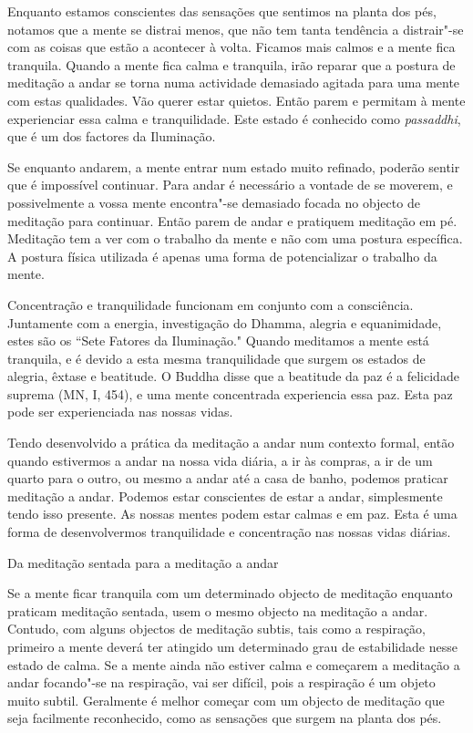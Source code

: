 Enquanto estamos conscientes das sensações que sentimos na planta dos
pés, notamos que a mente se distrai menos, que não tem tanta tendência a
distrair"-se com as coisas que estão a acontecer à volta. Ficamos mais
calmos e a mente fica tranquila. Quando a mente fica calma e tranquila,
irão reparar que a postura de meditação a andar se torna numa actividade
demasiado agitada para uma mente com estas qualidades. Vão querer estar
quietos. Então parem e permitam à mente experienciar essa calma e
tranquilidade. Este estado é conhecido como \emph{passaddhi}, que é um
dos factores da Iluminação.

Se enquanto andarem, a mente entrar num estado muito refinado, poderão
sentir que é impossível continuar. Para andar é necessário a vontade de
se moverem, e possivelmente a vossa mente encontra"-se demasiado focada
no objecto de meditação para continuar. Então parem de andar e pratiquem
meditação em pé. Meditação tem a ver com o trabalho da mente e não com
uma postura específica. A postura física utilizada é apenas uma forma de
potencializar o trabalho da mente.

Concentração e tranquilidade funcionam em conjunto com a consciência.
Juntamente com a energia, investigação do Dhamma, alegria e
equanimidade, estes são os ``Sete Fatores da Iluminação." Quando
meditamos a mente está tranquila, e é devido a esta mesma
tranquilidade que surgem os estados de alegria, êxtase e beatitude. O
Buddha disse que a beatitude da paz é a felicidade suprema (MN, I, 454),
e uma mente concentrada experiencia essa paz. Esta paz pode ser
experienciada nas nossas vidas.

Tendo desenvolvido a prática da meditação a andar num contexto formal,
então quando estivermos a andar na nossa vida diária, a ir às compras, a
ir de um quarto para o outro, ou mesmo a andar até a casa de banho,
podemos praticar meditação a andar. Podemos estar conscientes de estar a
andar, simplesmente tendo isso presente. As nossas mentes podem estar
calmas e em paz. Esta é uma forma de desenvolvermos tranquilidade e
concentração nas nossas vidas diárias.

\begin{siderule-quote}
  Da meditação sentada para a meditação a andar
\end{siderule-quote}

Se a mente ficar tranquila com um determinado objecto de meditação
enquanto praticam meditação sentada, usem o mesmo objecto na meditação a
andar. Contudo, com alguns objectos de meditação subtis, tais como a
respiração, primeiro a mente deverá ter atingido um determinado grau de
estabilidade nesse estado de calma. Se a mente ainda não estiver calma e
começarem a meditação a andar focando"-se na respiração, vai ser difícil,
pois a respiração é um objeto muito subtil. Geralmente é melhor começar
com um objecto de meditação que seja facilmente reconhecido, como as
sensações que surgem na planta dos pés.

